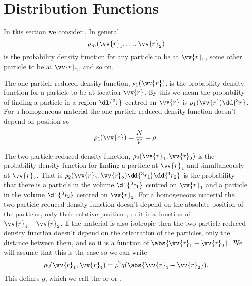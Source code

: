 \documentclass[fleqn]{NotesClass}
\begin{document}
    \section{Distribution Functions}
    In this section we consider .
    In general
    \begin{equation}
        \rho_m(\vv{r}_1, \dotsc, \vv{r}_2)
    \end{equation}
    is the probability density function for any particle to be at \(\vv{r}_1\), some other particle to be at \(\vv{r}_2\), and so on.
    
    The one-particle reduced density function, \(\rho_1(\vv{r})\), is the probability density function for a particle to be at location \(\vv{r}\).
    By this we mean the probability of finding a particle in a region \(\dl{^3r}\) centred on \(\vv{r}\) is \(\rho_1(\vv{r})\dd{^3r}\).
    For a homogeneous material the one-particle reduced density function doesn't depend on position so
    \begin{equation}
        \rho_1(\vv{r}) = \frac{N}{V} = \rho.
    \end{equation}
    
    The two-particle reduced density function, \(\rho_2(\vv{r}_1, \vv{r}_2)\) is the probability density function for finding a particle at \(\vv{r}_1\) and simultaneously at \(\vv{r}_2\).
    That is \(\rho_2(\vv{r}_1, \vv{r}_2)\dd{^3r_1}\dd{^3r_2}\) is the probability that there is a particle in the volume \(\dl{^3r_1}\) centred on \(\vv{r}_1\) and a particle in the volume \(\dl{^3r_2}\) centred on \(\vv{r}_2\).
    For a homogeneous material the two-particle reduced density function doesn't depend on the absolute position of the particles, only their relative positions, so it is a function of \(\vv{r}_1 - \vv{r}_2\).
    If the material is also isotropic then the two-particle reduced density function doesn't depend on the orientation of the particles, only the distance between them, and so it is a function of \(\abs{\vv{r}_1 - \vv{r}_2}\).
    We will assume that this is the case so we can write
    \begin{equation}
        \rho_2(\vv{r}_1, \vv{r}_2) = \rho^2 g(\abs{\vv{r}_1 - \vv{r}_2}).
    \end{equation}
    This defines \(g\), which we call the  or  or .
    
\end{document}
